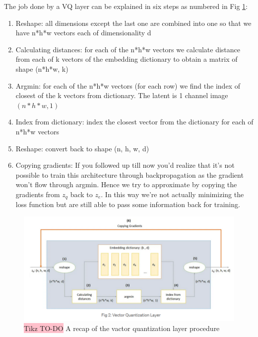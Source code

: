 The job done by a VQ layer can be explained in six steps as numbered in Fig \ref{fig:Vector-Quantization-layer}:


\begin{enumerate}
    \item Reshape: all dimensions except the last one are combined into one so that we have n*h*w vectors each of dimensionality d
    \vspace{ 5 pt}
    
    \item Calculating distances: for each of the n*h*w vectors we calculate distance from each of k vectors of the embedding dictionary to obtain a matrix of shape (n*h*w, k)
    \vspace{ 5 pt}
    
    \item Argmin: for each of the n*h*w vectors (for each row) we find the index of closest of the k vectors from dictionary. The latent is 1 channel image $(n*h*w,1)$
    \vspace{ 5 pt}
    
    \item Index from dictionary: index the closest vector from the dictionary for each of n*h*w vectors
    \vspace{ 5 pt}
    
    \item Reshape: convert back to shape (n, h, w, d)
    \vspace{ 5 pt}
    
    \item Copying gradients: If you followed up till now you’d realize that it’s not possible to train this architecture through backpropagation as the gradient won’t flow through argmin. Hence we try to approximate by copying the gradients from $z_q$ back to $z_e$. In this way we’re not actually minimizing the loss function but are still able to pass some information back for training.
\end{enumerate}

\begin{figure}[!htbp]
    \centering
    \includegraphics[width=\linewidth]{tikz/VQVAE Vector Quantization .png}
    \caption{{\color{red}\colorbox{pink}{Tikz TO-DO}} A recap of the vactor quantization layer procedure}
    \label{fig:Vector-Quantization-layer}
\end{figure}
    
